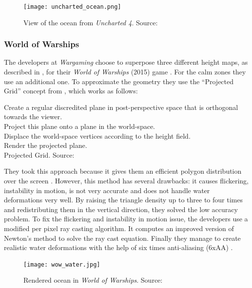 \begin{figure}[hbt]
    \centering
    \texttt{[image: uncharted\_ocean.png]}
    \caption{View of the ocean from \textit{Uncharted 4}. Source:
    \autocite{gonzalez2016rendering}}\label{fig:uncharted}
\end{figure}


\subsubsection{World of Warships}\label{subsub:world_of_warships}

The developers at \textit{Wargaming} choose to superpose three different height
maps, as described in \autocite[Chapter~18]{pharr2005gpu}, for their
\textit{World of Warships} (2015) game \autocite{kryachko2016sea}.  For the calm
zones they use an additional one. To approximate the geometry they use the
``Projected Grid'' concept from \autocite{claes2004real}, which works as
follows:

\begin{algorithm}
    \small
    \DontPrintSemicolon{}
    Create a regular discredited plane in post-perspective space that is
    orthogonal towards the viewer.\\
    Project this plane onto a plane in the world-space.\\
    Displace the world-space vertices according to the height field.\\
    Render the projected plane.\\
    \caption{\small{Projected Grid. Source:
    \autocite{claes2004real}}}\label{algo:projected_grid}
\end{algorithm}

They took this approach because it gives them an efficient polygon distribution
over the screen \autocite{kryachko2016sea}. However, this method has several
drawbacks: it causes flickering, instability in motion, is not very accurate and
does not handle water deformations very well. By raising the triangle density up
to three to four times and redistributing them in the vertical direction, they
solved the low accuracy problem. To fix the flickering and instability in motion
issue, the developers use a modified per pixel ray casting algorithm. It
computes an improved version of Newton's method to solve the ray cast equation.
Finally they manage to create realistic water deformations with the help of six
times anti-aliasing (6xAA) \autocite{kryachko2016sea}.

\begin{figure}[hbt]
    \centering
    \texttt{[image: wow\_water.jpg]}
    \caption{Rendered ocean in \textit{World of Warships}. Source:
    \autocite{kryachko2016sea}}\label{fig:wow_sea}
\end{figure}

